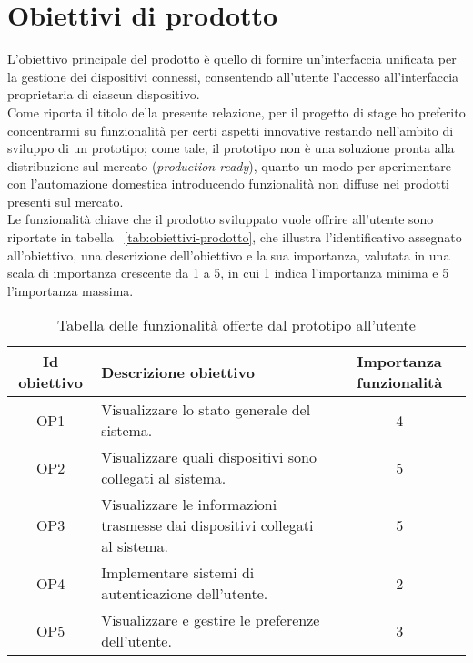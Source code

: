 \section{Obiettivi di prodotto}

L'obiettivo principale del prodotto è quello di fornire un'interfaccia unificata per la gestione dei dispositivi connessi, consentendo all'utente l'accesso all'interfaccia proprietaria di ciascun dispositivo. \\

Come riporta il titolo della presente relazione, per il progetto di stage ho preferito concentrarmi su funzionalità per certi aspetti innovative restando nell'ambito di sviluppo di un prototipo; come tale, il prototipo non è una soluzione pronta alla distribuzione sul mercato (\emph{production-ready}), quanto un modo per sperimentare con l'automazione domestica introducendo funzionalità non diffuse nei prodotti presenti sul mercato. \\

Le funzionalità chiave che il prodotto sviluppato vuole offrire all'utente sono riportate in tabella ~\ref{tab:obiettivi-prodotto}, che illustra l'identificativo assegnato all'obiettivo, una descrizione dell'obiettivo e la sua importanza, valutata in una scala di importanza crescente da 1 a 5, in cui 1 indica l'importanza minima e 5 l'importanza massima. 

\begin{table}[H]
\caption{Tabella delle funzionalità offerte dal prototipo all'utente}
\label{tab:obiettivi-prodotto}
\begin{tabularx}{\linewidth}{|c|X|c|}
\hline
\textbf{Id obiettivo} & \textbf{Descrizione obiettivo} & \textbf{Importanza funzionalità}\\
\hline
\label{OP1} OP1 & Visualizzare lo stato generale del sistema. & 4 \\
\hline
\label{OP2} OP2 & Visualizzare quali dispositivi sono collegati al sistema. & 5 \\
\hline
\label{OP3} OP3 & Visualizzare le informazioni trasmesse dai dispositivi collegati al sistema. & 5 \\
\hline
\label{OP4} OP4 & Implementare sistemi di autenticazione dell'utente. & 2 \\
\hline
\label{OP5} OP5 & Visualizzare e gestire le preferenze dell'utente. & 3 \\
\hline
\end{tabularx}
\end{table}

